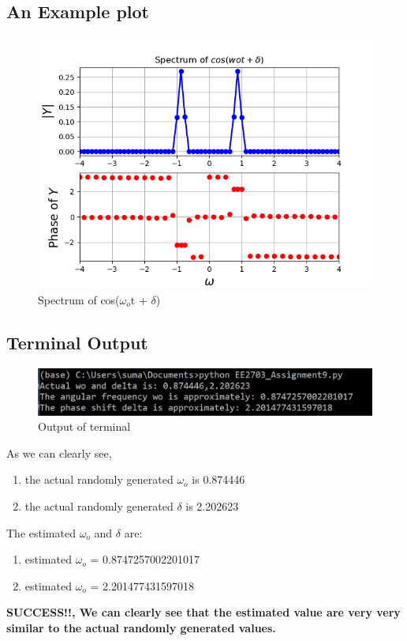 \documentclass[11pt]{article}
\begin{document}
\subsection{An Example plot}
\begin{figure}[H]
    \centering
    \includegraphics[scale = 0.75]{Figure_8.png}
    \caption{Spectrum of cos($\omega _o$t + $\delta$)}
\end{figure}

\subsection{Terminal Output}
\begin{figure}[H]
    \centering
    \includegraphics[scale = 0.75]{Output_1.jpg}
    \caption{Output of terminal}
\end{figure}
As we can clearly see, 
\begin{enumerate}
    \item the actual randomly generated $\omega _o$ is 0.874446 
    \item the actual randomly generated $\delta$ is 2.202623
\end{enumerate}
The estimated $\omega _o$ and $\delta$ are:
\begin{enumerate}
    \item estimated $\omega _o$ = 0.8747257002201017
    \item estimated $\omega _o$ = 2.201477431597018
\end{enumerate}
\textbf{SUCCESS!!, We can clearly see that the estimated value are very very similar to the actual randomly generated values.}
\end{document}
